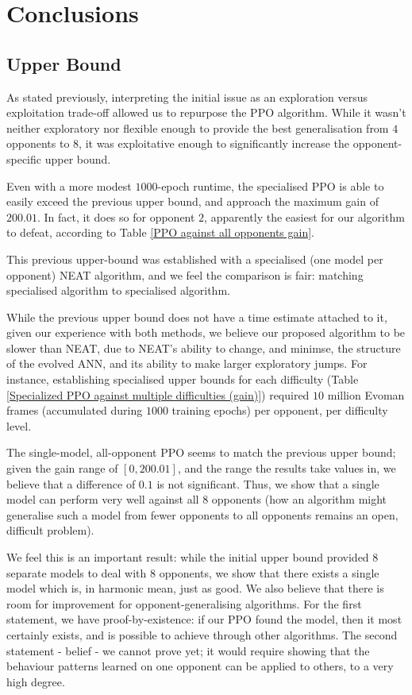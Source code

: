 \documentclass[conference]{IEEEtran}
\begin{document}
    \section{Conclusions}\label{sec:conclusions}
    \subsection{Upper Bound}
    As stated previously, interpreting the initial issue as an exploration versus exploitation trade-off allowed us to repurpose the PPO algorithm. While it wasn't neither exploratory nor flexible enough to provide the best generalisation from $4$ opponents to $8$, it was exploitative enough to significantly increase the opponent-specific upper bound.
   
    Even with a more modest $1000$-epoch runtime, the specialised PPO is able to easily exceed the previous upper bound\cite{evoman}, and approach the maximum gain of $200.01$. In fact, it does so for opponent $2$, apparently the easiest for our algorithm to defeat, according to Table \ref{PPO against all opponents gain}.

    This previous upper-bound was established with a specialised (one model per opponent) NEAT algorithm, and we feel the comparison is fair: matching specialised algorithm to specialised algorithm.

    While the previous upper bound does not have a time estimate attached to it, given our experience with both methods, we believe our proposed algorithm to be slower than NEAT, due to NEAT's ability to change, and minimse, the structure of the evolved ANN, and its ability to make larger exploratory jumps. For instance, establishing specialised upper bounds for each difficulty (Table \ref{Specialized PPO against multiple difficulties (gain)}) required $10$ million Evoman frames (accumulated during $1000$ training epochs) per opponent, per difficulty level.

    The single-model, all-opponent PPO seems to match the previous upper bound; given the gain range of $[0, 200.01]$, and the range the results take values in, we believe that a difference of $0.1$ is not significant. Thus, we show that a single model can perform very well against all $8$ opponents (how an algorithm might generalise such a model from fewer opponents to all opponents remains an open, difficult problem).

    We feel this is an important result: while the initial upper bound\cite{evoman} provided $8$ separate models to deal with $8$ opponents, we show that there exists a single model which is, in harmonic mean, just as good. We also believe that there is room for improvement for opponent-generalising algorithms. For the first statement, we have proof-by-existence: if our PPO found the model, then it most certainly exists, and is possible to achieve through other algorithms. The second statement - belief - we cannot prove yet; it would require showing that the behaviour patterns learned on one opponent can be applied to others, to a very high degree.
\end{document}
